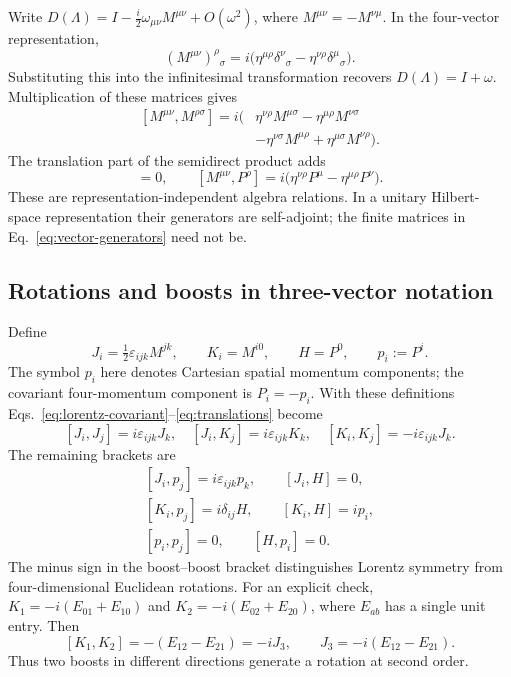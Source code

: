 \documentclass[11pt]{article}
\newcommand{\eps}{\varepsilon}
\begin{document}
Write \(D(\Lambda)=I-\tfrac i2\omega_{\mu\nu}M^{\mu\nu}+O(\omega^2)\),
where \(M^{\mu\nu}=-M^{\nu\mu}\). In the four-vector representation,
\begin{equation}
 (M^{\mu\nu})^\rho{}_{\sigma}
 =i\bigl(\eta^{\mu\rho}\delta^\nu{}_{\sigma}
       -\eta^{\nu\rho}\delta^\mu{}_{\sigma}\bigr).
 \label{eq:vector-generators}
\end{equation}
Substituting this into the infinitesimal transformation recovers
\(D(\Lambda)=I+\omega\). Multiplication of these matrices gives
\begin{equation}
 \begin{split}
 [M^{\mu\nu},M^{\rho\sigma}]
 =i\bigl(&\eta^{\nu\rho}M^{\mu\sigma}
          -\eta^{\mu\rho}M^{\nu\sigma}\\
         &-\eta^{\nu\sigma}M^{\mu\rho}
          +\eta^{\mu\sigma}M^{\nu\rho}\bigr).
 \end{split}
 \label{eq:lorentz-covariant}
\end{equation}
The translation part of the semidirect product adds
\begin{equation}
 [P^\mu,P^\nu]=0,\qquad
 [M^{\mu\nu},P^\rho]
 =i\bigl(\eta^{\nu\rho}P^\mu-\eta^{\mu\rho}P^\nu\bigr).
 \label{eq:translations}
\end{equation}
These are representation-independent algebra relations. In a unitary
Hilbert-space representation their generators are self-adjoint; the
finite matrices in Eq.~\eqref{eq:vector-generators} need not be.

\subsection{Rotations and boosts in three-vector notation}
Define
\begin{equation}
 J_i=\tfrac12\eps_{ijk}M^{jk},\qquad K_i=M^{i0},\qquad H=P^0,
 \qquad p_i:=P^i.
 \label{eq:JK-def}
\end{equation}
The symbol \(p_i\) here denotes Cartesian spatial momentum components;
the covariant four-momentum component is \(P_i=-p_i\).
With these definitions Eqs.~\eqref{eq:lorentz-covariant}--\eqref{eq:translations}
become
\begin{equation}
 \boxed{[J_i,J_j]=i\eps_{ijk}J_k,\quad
 [J_i,K_j]=i\eps_{ijk}K_k,\quad
 [K_i,K_j]=-i\eps_{ijk}J_k.}
 \label{eq:JK-algebra}
\end{equation}
The remaining brackets are
\begin{equation}
 \begin{gathered}
 [J_i,p_j]=i\eps_{ijk}p_k,\qquad [J_i,H]=0,\\
 [K_i,p_j]=i\delta_{ij}H,\qquad [K_i,H]=ip_i,\\
 [p_i,p_j]=0,\qquad [H,p_i]=0.
 \end{gathered}
 \label{eq:poincare-three}
\end{equation}
The minus sign in the boost--boost bracket distinguishes Lorentz
symmetry from four-dimensional Euclidean rotations. For an explicit
check, \(K_1=-i(E_{01}+E_{10})\) and
\(K_2=-i(E_{02}+E_{20})\), where \(E_{ab}\) has a single unit entry.
Then
\[
 [K_1,K_2]=-(E_{12}-E_{21})=-iJ_3,
 \qquad J_3=-i(E_{12}-E_{21}).
\]
Thus two boosts in different directions generate a rotation at second order.
\end{document}
